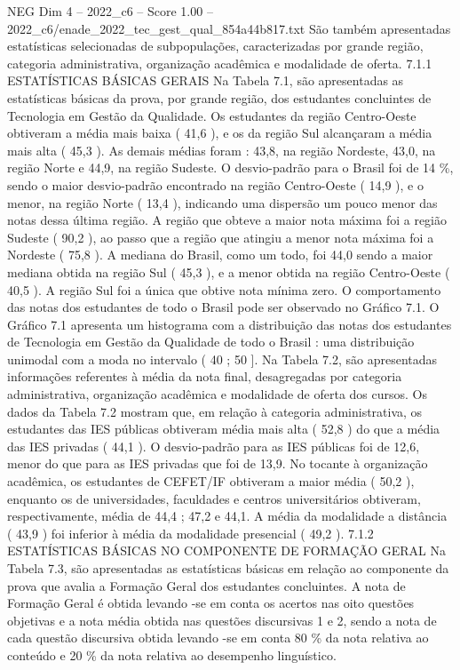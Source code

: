 \begin{textsample}{NEG Dim 4 – 2022\_c6 – Score 1.00 – 2022\_c6/enade\_2022\_tec\_gest\_qual\_854a44b817.txt}
São também apresentadas estatísticas selecionadas de subpopulações, caracterizadas por grande região, categoria administrativa, organização acadêmica e modalidade de oferta. 7.1.1 ESTATÍSTICAS BÁSICAS GERAIS Na Tabela 7.1, são apresentadas as estatísticas básicas da prova, por grande região, dos estudantes concluintes de Tecnologia em Gestão da Qualidade.
Os estudantes da região Centro-Oeste obtiveram a média mais baixa ( 41,6 ), e os da região Sul alcançaram a média mais alta ( 45,3 ).
As demais médias foram : 43,8, na região Nordeste, 43,0, na região Norte e 44,9, na região Sudeste.
O desvio-padrão para o Brasil foi de 14 \%, sendo o maior desvio-padrão encontrado na região Centro-Oeste ( 14,9 ), e o menor, na região Norte ( 13,4 ), indicando uma dispersão um pouco menor das notas dessa última região.
A região que obteve a maior nota máxima foi a região Sudeste ( 90,2 ), ao passo que a região que atingiu a menor nota máxima foi a Nordeste ( 75,8 ).
A mediana do Brasil, como um todo, foi 44,0 sendo a maior mediana obtida na região Sul ( 45,3 ), e a menor obtida na região Centro-Oeste ( 40,5 ).
A região Sul foi a única que obtive nota mínima zero.
O comportamento das notas dos estudantes de todo o Brasil pode ser observado no Gráfico 7.1.
O Gráfico 7.1 apresenta um histograma com a distribuição das notas dos estudantes de Tecnologia em Gestão da Qualidade de todo o Brasil : uma distribuição unimodal com a moda no intervalo ( 40 ; 50 ].
Na Tabela 7.2, são apresentadas informações referentes à média da nota final, desagregadas por categoria administrativa, organização acadêmica e modalidade de oferta dos cursos.
Os dados da Tabela 7.2 mostram que, em relação à categoria administrativa, os estudantes das IES públicas obtiveram média mais alta ( 52,8 ) do que a média das IES privadas ( 44,1 ).
O desvio-padrão para as IES públicas foi de 12,6, menor do que para as IES privadas que foi de 13,9.
No tocante à organização acadêmica, os estudantes de CEFET/IF obtiveram a maior média ( 50,2 ), enquanto os de universidades, faculdades e centros universitários obtiveram, respectivamente, média de 44,4 ; 47,2 e 44,1.
A média da modalidade a distância ( 43,9 ) foi inferior à média da modalidade presencial ( 49,2 ). 7.1.2 ESTATÍSTICAS BÁSICAS NO COMPONENTE DE FORMAÇÃO GERAL Na Tabela 7.3, são apresentadas as estatísticas básicas em relação ao componente da prova que avalia a Formação Geral dos estudantes concluintes.
A nota de Formação Geral é obtida levando -se em conta os acertos nas oito questões objetivas e a nota média obtida nas questões discursivas 1 e 2, sendo a nota de cada questão discursiva obtida levando -se em conta 80 \% da nota relativa ao conteúdo e 20 \% da nota relativa ao desempenho linguístico.

\end{textsample}
